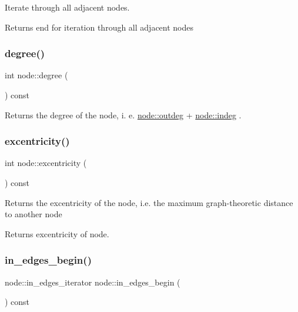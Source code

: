 Iterate through all adjacent nodes.

\begin{DoxyReturn}{Returns}
end for iteration through all adjacent nodes 
\end{DoxyReturn}
\mbox{\label{classnode_a1e5e94e426da180a069cf307616e38e3}} 
\subsubsection{\texorpdfstring{degree()}{degree()}}
{\footnotesize\ttfamily int node\+::degree (\begin{DoxyParamCaption}{ }\end{DoxyParamCaption}) const}

Returns the degree of the node, i. e. \mbox{\hyperlink{classnode_a32adc45c4132e2642ccd2233d79ffe67}{node\+::outdeg}} + \mbox{\hyperlink{classnode_a749bfd1316584b96f8c9b0e44ad512f0}{node\+::indeg}} . \mbox{\label{classnode_aba6b3a48e7b951f08ebbbf3275f0ce9a}} 
\subsubsection{\texorpdfstring{excentricity()}{excentricity()}}
{\footnotesize\ttfamily int node\+::excentricity (\begin{DoxyParamCaption}{ }\end{DoxyParamCaption}) const}

Returns the excentricity of the node, i.\+e. the maximum graph-\/theoretic distance to another node

\begin{DoxyReturn}{Returns}
excentricity of node. 
\end{DoxyReturn}
\mbox{\label{classnode_a0c32377f370ae52ed2134ff8d4dac584}} 
\subsubsection{\texorpdfstring{in\+\_\+edges\+\_\+begin()}{in\_edges\_begin()}}
{\footnotesize\ttfamily node\+::in\+\_\+edges\+\_\+iterator node\+::in\+\_\+edges\+\_\+begin (\begin{DoxyParamCaption}{ }\end{DoxyParamCaption}) const}

